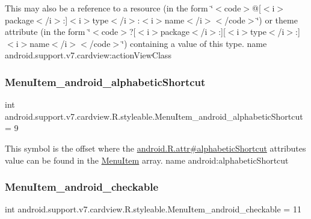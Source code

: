 This may also be a reference to a resource (in the form \char`\"{}$<$code$>$@\mbox{[}$<$i$>$package$<$/i$>$\+:\mbox{]}$<$i$>$type$<$/i$>$\+:$<$i$>$name$<$/i$>$$<$/code$>$\char`\"{}) or theme attribute (in the form \char`\"{}$<$code$>$?\mbox{[}$<$i$>$package$<$/i$>$\+:\mbox{]}\mbox{[}$<$i$>$type$<$/i$>$\+:\mbox{]}$<$i$>$name$<$/i$>$$<$/code$>$\char`\"{}) containing a value of this type.  name android.\+support.\+v7.\+cardview\+:action\+View\+Class \mbox{\label{classandroid_1_1support_1_1v7_1_1cardview_1_1R_1_1styleable_a0b91d93cd360e9465c306a85707eb4ac}} 
\subsubsection{\texorpdfstring{Menu\+Item\+\_\+android\+\_\+alphabetic\+Shortcut}{MenuItem\_android\_alphabeticShortcut}}
{\footnotesize\ttfamily int android.\+support.\+v7.\+cardview.\+R.\+styleable.\+Menu\+Item\+\_\+android\+\_\+alphabetic\+Shortcut = 9\hspace{0.3cm}{\ttfamily [static]}}

This symbol is the offset where the \hyperlink{}{android.\+R.\+attr\#alphabetic\+Shortcut} attribute\textquotesingle{}s value can be found in the \hyperlink{classandroid_1_1support_1_1v7_1_1cardview_1_1R_1_1styleable_a0a483b830af809d94b22d4901e758447}{Menu\+Item} array.  name android\+:alphabetic\+Shortcut \mbox{\label{classandroid_1_1support_1_1v7_1_1cardview_1_1R_1_1styleable_a1ab1fd5f17ea58611817a12d2ef3713b}} 
\subsubsection{\texorpdfstring{Menu\+Item\+\_\+android\+\_\+checkable}{MenuItem\_android\_checkable}}
{\footnotesize\ttfamily int android.\+support.\+v7.\+cardview.\+R.\+styleable.\+Menu\+Item\+\_\+android\+\_\+checkable = 11\hspace{0.3cm}{\ttfamily [static]}}

